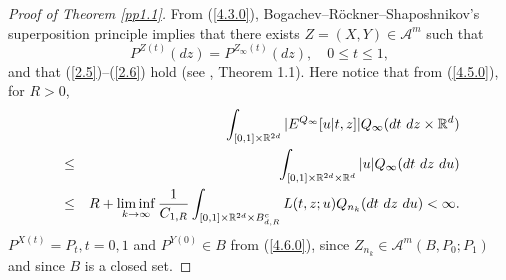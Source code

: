 \documentclass[12pt]{article}
\begin{document}
\begin{proof}[Proof of Theorem \ref{pp1.1}]

From (\ref{4.3.0}), Bogachev--R\"ockner--Shaposhnikov's superposition principle implies that 
there exists $Z=(X,Y)\in \mathcal{A}^m$ such that 
\begin{equation}\label{4.6.0}
P^{Z(t)}(dz)=P^{Z_\infty(t)}(dz),\quad 0\le t\le 1,
\end{equation}
and that (\ref{2.5})--(\ref{2.6}) hold (see \cite{Bog21}, Theorem 1.1).
Here notice that from (\ref{4.5.0}), for $R>0$, 
\begin{eqnarray*}
&&\int_{[0,1]\times \mathbb{R}^{2d}}
|E^{Q_\infty}[u|t,z]|Q_\infty(dt\hbox{ }dz\times \mathbb{R}^d)\nonumber\\
&\le& \int_{[0,1]\times \mathbb{R}^{2d}\times \mathbb{R}^{d}} |u|Q_{\infty} (dt\hbox{ }dz\hbox{ }du)\\
& \le& R+\liminf_{k\to\infty}\frac{1}{C_{1,R}
}\int_{[0,1]\times \mathbb{R}^{2d}\times B_{d,R}^c} L(t,z;u)Q_{n_k} (dt\hbox{ }dz\hbox{ }du)<\infty.
\end{eqnarray*}
$P^{X(t)}=P_t, t=0,1$ and $P^{Y(0)}\in B $ from (\ref{4.6.0}), since $Z_{n_k}\in\mathcal{A}^m (B ,P_0;P_1)$
and since $B$ is a closed set.


\end{proof}
\end{document}
